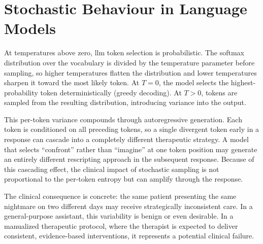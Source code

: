 

\section{Stochastic Behaviour in Language Models}
\label{sec:bg-stochastic}
%
%
%

At temperatures above zero, \gls{llm} token selection is probabilistic.
The softmax distribution over the vocabulary is divided by the temperature
parameter before sampling, so higher temperatures flatten the distribution
and lower temperatures sharpen it toward the most likely token. At $T = 0$,
the model selects the highest-probability token deterministically (greedy
decoding). At $T > 0$, tokens are sampled from the resulting distribution,
introducing variance into the output.

This per-token variance compounds through autoregressive generation. Each
token is conditioned on all preceding tokens, so a single divergent token
early in a response can cascade into a completely different therapeutic
strategy. A model that selects ``confront'' rather than ``imagine'' at one
token position may generate an entirely different rescripting approach in the
subsequent response. Because of this cascading effect, the
clinical impact of stochastic sampling is not proportional to the per-token
entropy but can amplify through the response.

The clinical consequence is concrete: the same patient presenting the same
nightmare on two different days may receive strategically inconsistent care.
In a general-purpose assistant, this variability is benign or even desirable.
In a manualized therapeutic protocol, where the therapist is expected to
deliver consistent, evidence-based interventions, it represents a potential
clinical failure.

